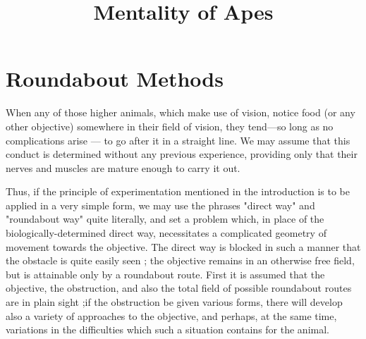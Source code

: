 \documentclass{article}
\title{Mentality of Apes}
\date{}
\begin{document}
\maketitle

\section{Roundabout Methods\protect\footnotemark} 

When any of those higher animals, which make use of vision,
notice food (or any other objective) somewhere in their field
of vision, they tend—so long as no complications arise
—
to go after it in a straight line. We may assume that this
conduct is determined without any previous experience,
providing only that their nerves and muscles are mature
enough to carry it out.

Thus, if the principle of experimentation mentioned in
the introduction is to be applied in a very simple form, we
may use the phrases "direct way" and "roundabout way"
quite literally, and set a problem which, in place of the
biologically-determined direct way, necessitates a complicated
geometry of movement towards the objective. The direct
way is blocked in such a manner that the obstacle is quite
easily seen ; the objective remains in an otherwise free field,
but is attainable only by a roundabout route. First it is
assumed that the objective, the obstruction, and also the
total field of possible roundabout routes are in plain sight
;if the obstruction be given various forms, there will develop
also a variety of approaches to the objective, and perhaps,
at the same time, variations in the difficulties which such a
situation contains for the animal.
\end{document}
